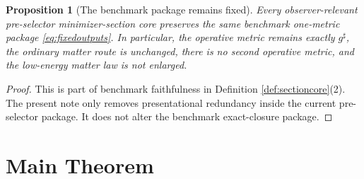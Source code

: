 \documentclass[11pt]{article}
\newcommand{\CompletedMetric}{g^{\sharp}}
\newtheorem{proposition}{Proposition}
\begin{document}
\begin{proposition}[The benchmark package remains fixed]
\label{prop:benchmark}
Every observer-relevant pre-selector minimizer-section core preserves the same benchmark one-metric package \eqref{eq:fixedoutputs}. In particular, the operative metric remains exactly \(\CompletedMetric\), the ordinary matter route is unchanged, there is no second operative metric, and the low-energy matter law is not enlarged.
\end{proposition}

\begin{proof}
This is part of benchmark faithfulness in Definition \ref{def:sectioncore}(2). The present note only removes presentational redundancy inside the current pre-selector package. It does not alter the benchmark exact-closure package.
\end{proof}

\section{Main Theorem}
\end{document}
